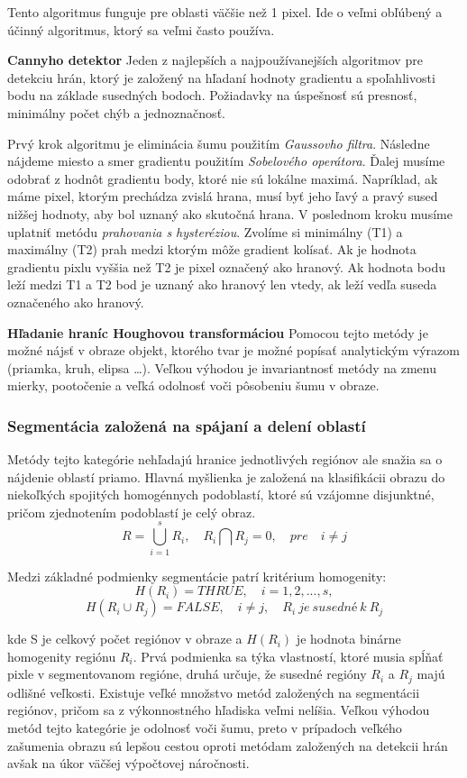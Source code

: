 Tento algoritmus funguje pre oblasti väčšie než 1 pixel.  Ide o veľmi obľúbený a účinný algoritmus, ktorý sa veľmi často používa.

\textbf{Cannyho detektor}
Jeden z najlepších a najpoužívanejších algoritmov pre detekciu hrán, ktorý je založený na hľadaní hodnoty gradientu a spoľahlivosti bodu na základe susedných bodoch. Požiadavky na úspešnosť sú presnosť, minimálny počet chýb a jednoznačnosť. 

Prvý krok algoritmu je eliminácia šumu použitím \textit{Gaussovho filtra}.  Následne nájdeme miesto a smer gradientu použitím \textit{Sobelového operátora}. Ďalej musíme odobrať z hodnôt gradientu  body, ktoré nie sú lokálne maximá. Napríklad, ak máme pixel, ktorým prechádza zvislá hrana, musí byť jeho ľavý a pravý sused nižšej hodnoty, aby bol uznaný  ako skutočná hrana. V poslednom kroku musíme uplatniť metódu \textit{prahovania s hysteréziou}. Zvolíme si minimálny (T1) a maximálny (T2) prah medzi ktorým môže gradient kolísať.  Ak je hodnota gradientu pixlu vyššia než T2 je pixel označený ako hranový. Ak hodnota bodu leží medzi T1 a T2 bod je uznaný ako hranový len vtedy, ak leží vedľa suseda označeného ako hranový.


\textbf{Hľadanie hraníc Houghovou transformáciou}
Pomocou tejto metódy je možné nájsť v obraze objekt, ktorého tvar je možné popísať analytickým výrazom (priamka, kruh, elipsa …). Veľkou výhodou je invariantnosť metódy na zmenu mierky, pootočenie a veľká odolnosť voči pôsobeniu šumu v obraze. 

\subsubsection{Segmentácia založená na spájaní a delení oblastí}
Metódy tejto kategórie nehľadajú hranice jednotlivých regiónov ale snažia sa o nájdenie oblastí priamo. Hlavná myšlienka je založená na klasifikácii obrazu do niekoľkých spojitých homogénnych podoblastí, ktoré sú vzájomne disjunktné, pričom zjednotením podoblastí je celý obraz.
$$R=\bigcup_{i=1}^s R_i{,}\quad R_i\bigcap R_j=0{,}\quad{pre}\quad i\neq j$$

Medzi základné podmienky segmentácie patrí kritérium homogenity:
$$H(R_i)={THRUE}{,}\quad \textit{i}=1{,}2{,}{...}{,}s{,}$$
$$H(R_i \cup R_j)={FALSE}{,}\quad \textit{i} \neq \textit{j}{,}\quad R_i { \ je \ susedné \ k \ } R_j $$

kde S je celkový počet regiónov v obraze a $H(R_i)$ je hodnota binárne homogenity regiónu $R_i$. Prvá podmienka sa týka vlastností, ktoré musia spĺňať pixle v segmentovanom regióne, druhá určuje, že susedné regióny $R_i$ a $R_j$ majú odlišné veľkosti. Existuje veľké množstvo metód založených na segmentácii regiónov, pričom sa z výkonnostného hľadiska veľmi nelíšia. Veľkou výhodou metód tejto kategórie je odolnosť voči šumu, preto v prípadoch veľkého zašumenia obrazu sú lepšou cestou oproti metódam založených na detekcii hrán avšak na úkor väčšej výpočtovej náročnosti.  

